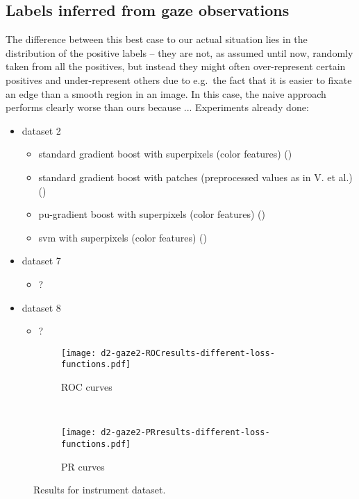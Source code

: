 \subsection{Labels inferred from gaze observations}
The difference between this best case to our actual situation lies in the distribution of the positive labels -- they are not, as assumed until now, randomly taken from all the positives, but instead they might often over-represent certain positives and under-represent others due to e.g.\ the fact that it is easier to fixate an edge than a smooth region in an image. 
In this case, the naive approach performs clearly worse than ours because ...  Experiments already done:
\begin{itemize}
\item dataset 2
  \begin{itemize}
  \item standard gradient boost with superpixels (color features) ()
  \item standard gradient boost with patches (preprocessed values as in V. et al.) ()
  \item pu-gradient boost with superpixels (color features) ()
  \item svm with superpixels (color features) ()
  \end{itemize}
\item dataset 7
  \begin{itemize}
  \item ?
  \end{itemize}
\item dataset 8
  \begin{itemize}
  \item ?
  \end{itemize}


\end{itemize}


\begin{figure}[ht]
	\centering
	\begin{subfigure}[h]{0.45\textwidth}
	\texttt{[image: d2-gaze2-ROCresults-different-loss-functions.pdf]}	
		\caption*{ROC curves}
	\end{subfigure}
	~
	\begin{subfigure}[h]{0.45\textwidth}
	\texttt{[image: d2-gaze2-PRresults-different-loss-functions.pdf]}	
		\caption*{PR curves}
	\end{subfigure}
	\caption{Results for instrument dataset.}
	\label{fig:d2-results-curves}
\end{figure}

